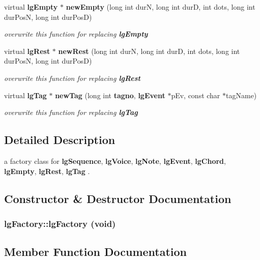 \begin{CompactItemize}
virtual {\bf lg\-Empty} $\ast$ {\bf new\-Empty} (long int dur\-N, long int dur\-D, int dots, long int dur\-Pos\-N, long int dur\-Pos\-D)
\begin{CompactList}\small\item\em overwrite this function for replacing {\bf lg\-Empty} \item\end{CompactList}\item 
virtual {\bf lg\-Rest} $\ast$ {\bf new\-Rest} (long int dur\-N, long int dur\-D, int dots, long int dur\-Pos\-N, long int dur\-Pos\-D)
\begin{CompactList}\small\item\em overwrite this function for replacing {\bf lg\-Rest} \item\end{CompactList}\item 
virtual {\bf lg\-Tag} $\ast$ {\bf new\-Tag} (long int {\bf tagno}, {\bf lg\-Event} $\ast$p\-Ev, const char $\ast$tag\-Name)
\begin{CompactList}\small\item\em overwrite this function for replacing {\bf lg\-Tag} \item\end{CompactList}\end{CompactItemize}


\subsection{Detailed Description}
a factory class for {\bf lg\-Sequence}, {\bf lg\-Voice}, {\bf lg\-Note}, {\bf lg\-Event}, {\bf lg\-Chord}, {\bf lg\-Empty}, {\bf lg\-Rest}, {\bf lg\-Tag} . 



\subsection{Constructor \& Destructor Documentation}
\subsubsection{\setlength{\rightskip}{0pt plus 5cm}lg\-Factory::lg\-Factory (void)\hspace{0.3cm}{\tt  [inline]}}\label{classlgFactory_a0}




\subsection{Member Function Documentation}
